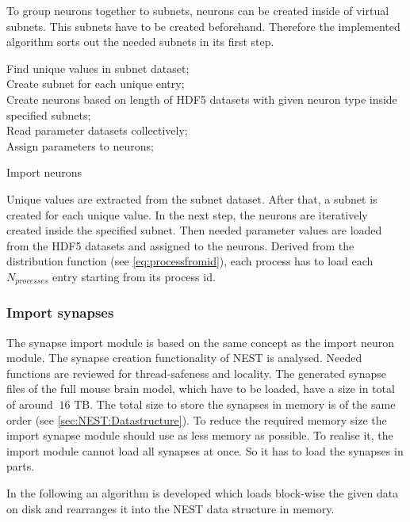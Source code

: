 To group neurons together to subnets, neurons can be created inside of virtual subnets.
This subnets have to be created beforehand.
Therefore the implemented algorithm sorts out the needed subnets in its first step.
\begin{algorithm}[ht!]
 Find unique values in subnet dataset; \\
 Create subnet for each unique entry; \\
 Create neurons based on length of HDF5 datasets with given neuron type inside specified subnets; \\
 Read parameter datasets collectively; \\
 Assign parameters to neurons;
\label{alg2}
\caption{Import neurons}
\end{algorithm}
Unique values are extracted from the subnet dataset.
After that, a subnet is created for each unique value. 
In the next step, the neurons are iteratively created inside the specified subnet.
Then needed parameter values are loaded from the HDF5 datasets and assigned to the neurons.
Derived from the distribution function (see \ref{eq:processfromid}), each process has to load each $N_{processes}$
entry starting from its process id.

\newpage
\subsubsection{Import synapses}
The synapse import module is based on the same concept as the import neuron module.
The synapse creation functionality of NEST is analysed.
Needed functions are reviewed for thread-safeness and locality.
The generated synapse files of the full mouse brain model, which have to be loaded, have a size in total of around $~16$ TB.
The total size to store the synapses in memory is of the same order (see \ref{sec:NEST:Datastructure}).
To reduce the required memory size the import synapse module should use as less memory as possible.
To realise it, the import module cannot load all synapses at once.
So it has to load the synapses in parts.

In the following an algorithm is developed which loads block-wise the given data on disk and rearranges it into
the NEST data structure in memory.

